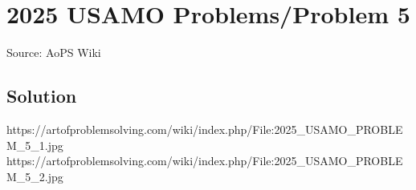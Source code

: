 \documentclass[12pt]{article}
\begin{document}
\section*{{2025 USAMO Problems/Problem 5}}
Source: AoPS Wiki

\subsection*{Solution}
https://artofproblemsolving.com/wiki/index.php/File:2025_USAMO_PROBLEM_5_1.jpg https://artofproblemsolving.com/wiki/index.php/File:2025_USAMO_PROBLEM_5_2.jpg
\end{document}
